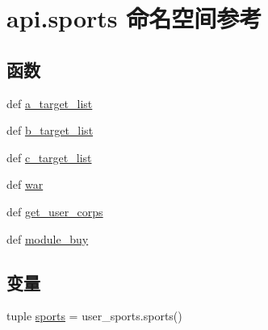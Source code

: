 \hypertarget{namespaceapi_1_1sports}{\section{api.\-sports 命名空间参考}
\label{namespaceapi_1_1sports}
}
\subsection*{函数}
\begin{DoxyCompactItemize}
\item 
def \hyperlink{namespaceapi_1_1sports_aefb3d1552aff3d0259dfea7d6f17c93e}{a\-\_\-target\-\_\-list}
\item 
def \hyperlink{namespaceapi_1_1sports_aa97ee2743a60c7cb3efba066881efb0e}{b\-\_\-target\-\_\-list}
\item 
def \hyperlink{namespaceapi_1_1sports_a6f3c5b7229e31df7f592656ab95edc79}{c\-\_\-target\-\_\-list}
\item 
def \hyperlink{namespaceapi_1_1sports_a41b30ce3343c0088453083f3c9d83def}{war}
\item 
def \hyperlink{namespaceapi_1_1sports_a609b16bc9aaf933d0866a230fc71de18}{get\-\_\-user\-\_\-corps}
\item 
def \hyperlink{namespaceapi_1_1sports_ab2590754d5a73e0585e0aa399cd57770}{module\-\_\-buy}
\end{DoxyCompactItemize}
\subsection*{变量}
\begin{DoxyCompactItemize}
\item 
tuple \hyperlink{namespaceapi_1_1sports_afc81cc67948e6b480a208956ece066e7}{sports} = user\-\_\-sports.\-sports()
\end{DoxyCompactItemize}


